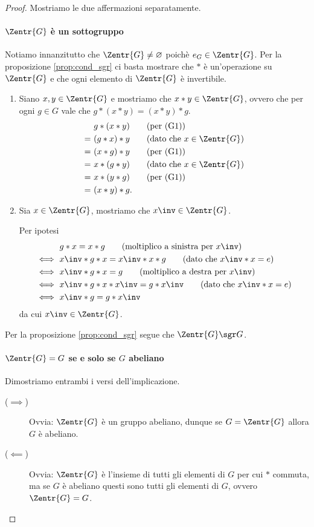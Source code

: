 \begin{proof} Mostriamo le due affermazioni separatamente.
    \paragraph{$\Zentr{G}$ è un sottogruppo} 
    Notiamo innanzitutto che $\Zentr{G} \neq \varnothing$ poichè $e_G \in \Zentr{G}$. Per la proposizione \ref{prop:cond_sgr} ci basta mostrare che $*$ è un'operazione su $\Zentr{G}$ e che ogni elemento di $\Zentr{G}$ è invertibile.
    \begin{enumerate}
        [label={(\arabic*)}]
        \item Siano $x, y \in \Zentr{G}$ e mostriamo che $x*y \in \Zentr{G}$, ovvero che per ogni $g \in G$ vale che $g*(x*y) = (x*y)*g$. 
        \begin{align*}
            &g*(x*y) \tag*{(per (G1))}\\
            =\ &(g*x)*y \tag*{(dato che $x \in \Zentr{G}$)}\\
            =\ &(x*g)*y \tag*{(per (G1))}\\
            =\ &x*(g*y) \tag*{(dato che $x \in \Zentr{G}$)} \\
            =\ &x*(y*g) \tag*{(per (G1))}\\
            =\ &(x*y)*g.
        \end{align*}
        \item Sia $x \in \Zentr{G}$, mostriamo che $x\inv \in \Zentr{G}$.
        
        Per ipotesi \begin{align*}
            &g*x = x*g \tag*{(moltiplico a sinistra per $x\inv$)} \\
            \iff\ &x\inv * g*x = x\inv * x*g\tag*{(dato che $x\inv * x = e$)} \\
            \iff\ &x\inv * g*x = g \tag*{(moltiplico a destra per $x\inv$)} \\
            \iff\ &x\inv * g*x*x\inv = g*x\inv \tag*{(dato che $x\inv * x = e$)} \\
            \iff\ &x\inv * g = g*x\inv
        \end{align*}
        da cui $x\inv \in \Zentr{G}$.
    \end{enumerate}

    Per la proposizione \ref{prop:cond_sgr} segue che $\Zentr{G} \sgr G$.

    \paragraph{$\Zentr{G} = G$ se e solo se $G$ abeliano} Dimostriamo entrambi i versi dell'implicazione.
    \begin{description}
        \item[($\implies$)] Ovvia: $\Zentr{G}$ è un gruppo abeliano, dunque se $G = \Zentr{G}$ allora $G$ è abeliano.
        \item[($\impliedby$)]  Ovvia: $\Zentr{G}$ è l'insieme di tutti gli elementi di $G$ per cui $*$ commuta, ma se $G$ è abeliano questi sono tutti gli elementi di $G$, ovvero $\Zentr{G} = G$.  \qedhere
    \end{description}
\end{proof}

